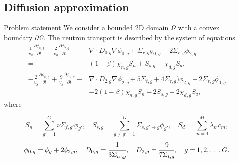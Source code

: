 \documentclass[10pt,pdf,hyperref={unicode}]{beamer}
\begin{document}
\subsection{Diffusion approximation}
	\begin{frame}{Problem statement}
		We consider a bounded 2D domain $\Omega$ with a convex boundary $\partial \Omega$. 
		The neutron transport is described by the system of equations
		\[
		\begin{split}
			\frac{1}{v_g} \frac{\partial \phi_{0,g}}{\partial t} -
			\frac{2}{v_g} \frac{\partial \phi_{2,g}}{\partial t} -
			& \nabla \cdot D_{0,g} \nabla \phi_{0,g} +
			\Sigma_{r,g} \phi_{0,g} -
			2 \Sigma_{r,g} \phi_{2,g} \\
			= & (1 - \beta) \chi_{n,g} S_{n} + S_{s,g} + \chi_{d,g} S_d, \\
			- \frac{2}{v_g} \frac{\partial \phi_{0,g}}{\partial t} +
			\frac{9}{v_g} \frac{\partial \phi_{2,g}}{\partial t} -
			& \nabla \cdot D_{2,g} \nabla \phi_{2,g} +
			5 \Sigma_{t,g} + 4\Sigma_{r,g}) \phi_{2,g} -
			2 \Sigma_{r,g} \phi_{0,g} \\
			= & - 2(1 - \beta) \chi_{n,g} S_{n} - 2 S_{s,g} - 2 \chi_{d,g} S_d,
		\end{split}
		\]
		where
		\begin{small}
		\[
			S_{n} = \sum_{g'=1}^{G} \nu \Sigma_{f,g'} \phi_{g'}, \quad
			S_{s,g} = \sum_{g\neq g'=1}^{G} \Sigma_{s,g' \rightarrow g} \phi_{g'}, \quad
			S_{d} = \sum_{m=1}^{M} \lambda_m c_m,
		\]
		\[
			\phi_{0,g} = \phi_g + 2\phi_{2,g}, \quad
			D_{0,g} = \cfrac{1}{3 \Sigma_{tr,g}}, \quad
			D_{2,g} = \cfrac{9}{7 \Sigma_{t,g}}, \quad 
			g = 1,2,\dots,G.
		\]
		\end{small}
	\end{frame}
\end{document}
